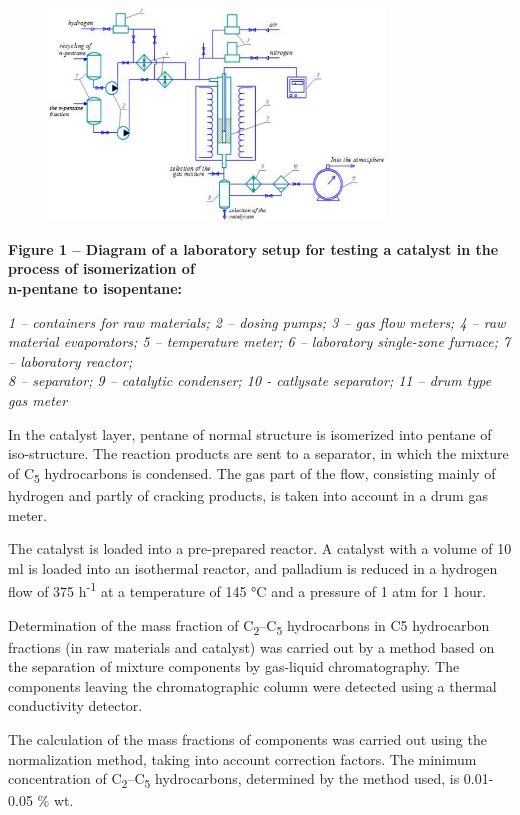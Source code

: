 \begin{figure}[H]
	\centering
	\includegraphics[width=0.8\textwidth]{assets/1053}
	\caption*{}
\end{figure} \textbf{Figure 1 -- Diagram of a
laboratory setup for testing a catalyst in the process of isomerization
of\\
n-pentane to isopentane:}

\emph{1 -- containers for raw materials; 2 -- dosing pumps; 3 -- gas
flow meters; 4 -- raw material evaporators; 5 -- temperature meter; 6 --
laboratory single-zone furnace; 7 -- laboratory reactor;\\
8 -- separator; 9 -- catalytic condenser; 10 - catlysate separator; 11
-- drum type gas meter}

In the catalyst layer, pentane of normal structure is isomerized into
pentane of iso-structure. The reaction products are sent to a separator,
in which the mixture of C\textsubscript{5} hydrocarbons is condensed.
The gas part of the flow, consisting mainly of hydrogen and partly of
cracking products, is taken into account in a drum gas meter.

The catalyst is loaded into a pre-prepared reactor. A catalyst with a
volume of 10 ml is loaded into an isothermal reactor, and palladium is
reduced in a hydrogen flow of 375 h\textsuperscript{-1} at a temperature
of 145 °C and a pressure of 1 atm for 1 hour.

Determination of the mass fraction of
C\textsubscript{2}--C\textsubscript{5} hydrocarbons in C5 hydrocarbon
fractions (in raw materials and catalyst) was carried out by a method
based on the separation of mixture components by gas-liquid
chromatography. The components leaving the chromatographic column were
detected using a thermal conductivity detector.

The calculation of the mass fractions of components was carried out
using the normalization method, taking into account correction factors.
The minimum concentration of C\textsubscript{2}--C\textsubscript{5}
hydrocarbons, determined by the method used, is 0.01-0.05 \% wt.


